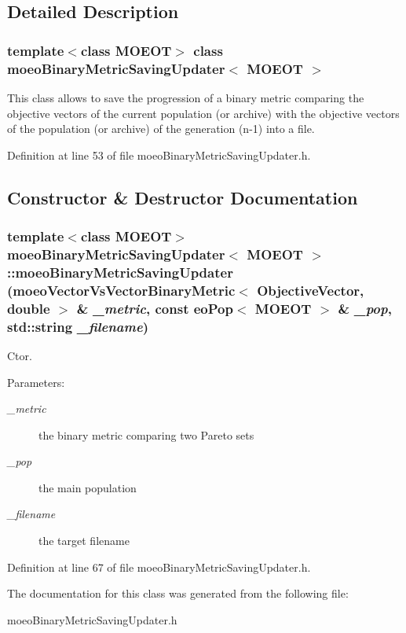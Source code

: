 \subsection{Detailed Description}
\subsubsection*{template$<$class MOEOT$>$ class moeo\-Binary\-Metric\-Saving\-Updater$<$ MOEOT $>$}

This class allows to save the progression of a binary metric comparing the objective vectors of the current population (or archive) with the objective vectors of the population (or archive) of the generation (n-1) into a file. 



Definition at line 53 of file moeo\-Binary\-Metric\-Saving\-Updater.h.

\subsection{Constructor \& Destructor Documentation}
\subsubsection{\setlength{\rightskip}{0pt plus 5cm}template$<$class MOEOT$>$ \bf{moeo\-Binary\-Metric\-Saving\-Updater}$<$ MOEOT $>$::\bf{moeo\-Binary\-Metric\-Saving\-Updater} (\bf{moeo\-Vector\-Vs\-Vector\-Binary\-Metric}$<$ \bf{Objective\-Vector}, double $>$ \& {\em \_\-metric}, const \bf{eo\-Pop}$<$ MOEOT $>$ \& {\em \_\-pop}, std::string {\em \_\-filename})\hspace{0.3cm}{\tt  [inline]}}\label{classmoeoBinaryMetricSavingUpdater_b7c3fb73caf759450367c76d4716bb62}


Ctor. 

\begin{Desc}
\item[Parameters:]
\begin{description}
\item[{\em \_\-metric}]the binary metric comparing two Pareto sets \item[{\em \_\-pop}]the main population \item[{\em \_\-filename}]the target filename \end{description}
\end{Desc}


Definition at line 67 of file moeo\-Binary\-Metric\-Saving\-Updater.h.

The documentation for this class was generated from the following file:\begin{CompactItemize}
\item 
moeo\-Binary\-Metric\-Saving\-Updater.h\end{CompactItemize}
